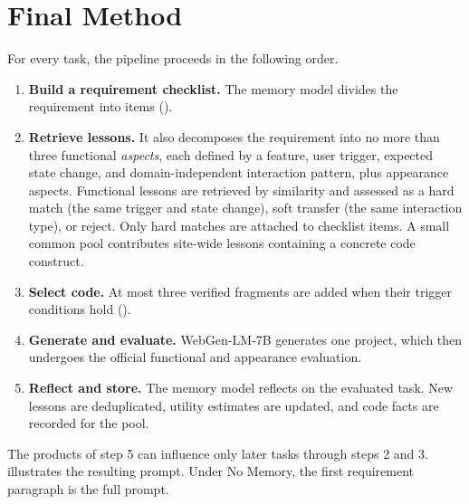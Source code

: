 \section{Final Method}
\label{sec:pipeline}
For every task, the pipeline proceeds in the following order.
\begin{enumerate}
  \item \textbf{Build a requirement checklist.} The memory model divides the requirement into items ().
  \item \textbf{Retrieve lessons.} It also decomposes the requirement into no more than three functional \emph{aspects}, each defined by a feature, user trigger, expected state change, and domain-independent interaction pattern, plus appearance aspects. Functional lessons are retrieved by similarity and assessed as a hard match (the same trigger and state change), soft transfer (the same interaction type), or reject. Only hard matches are attached to checklist items. A small common pool contributes site-wide lessons containing a concrete code construct.
  \item \textbf{Select code.} At most three verified fragments are added when their trigger conditions hold ().
  \item \textbf{Generate and evaluate.} WebGen-LM-7B generates one project, which then undergoes the official functional and appearance evaluation.
  \item \textbf{Reflect and store.} The memory model reflects on the evaluated task. New lessons are deduplicated, utility estimates are updated, and code facts are recorded for the pool.
\end{enumerate}
The products of step 5 can influence only later tasks through steps 2 and 3.  illustrates the resulting prompt. Under No Memory, the first requirement paragraph is the full prompt.

